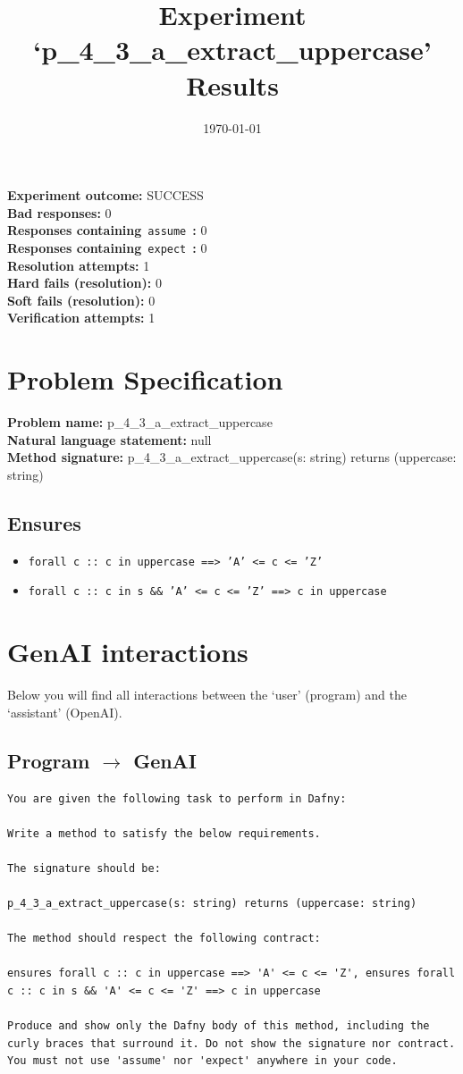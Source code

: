 \documentclass{article}
\begin{document}
\title{Experiment `p\_4\_3\_a\_extract\_uppercase' Results}
\author{\today}
\date{}
\maketitle
\textbf{Experiment outcome: }SUCCESS
\\\textbf{Bad responses: }0
\\\textbf{Responses containing}~\texttt{assume}~\textbf{: }0
\\\textbf{Responses containing}~\texttt{expect}~\textbf{: }0
\\\textbf{Resolution attempts: }1
\\\textbf{Hard fails (resolution): }0
\\\textbf{Soft fails (resolution): }0
\\\textbf{Verification attempts: }1
\section*{Problem Specification}
\textbf{Problem name: }p\_4\_3\_a\_extract\_uppercase
\\\textbf{Natural language statement: }null
\\\textbf{Method signature: }p\_4\_3\_a\_extract\_uppercase(s: string) returns (uppercase: string)
\subsection*{Ensures}
\begin{itemize}
\item \texttt{forall c :: c in uppercase ==> 'A' <= c <= 'Z'}
\item \texttt{forall c :: c in s \&\& 'A' <= c <= 'Z' ==> c in uppercase}
\end{itemize}
\clearpage
\section*{GenAI interactions}
Below you will find all interactions between the `user' (program) and the `assistant' (OpenAI).
\subsection*{Program $\rightarrow$ GenAI}
\begin{lstlisting}
You are given the following task to perform in Dafny:

Write a method to satisfy the below requirements.

The signature should be:

p_4_3_a_extract_uppercase(s: string) returns (uppercase: string)

The method should respect the following contract:

ensures forall c :: c in uppercase ==> 'A' <= c <= 'Z', ensures forall c :: c in s && 'A' <= c <= 'Z' ==> c in uppercase

Produce and show only the Dafny body of this method, including the curly braces that surround it. Do not show the signature nor contract. You must not use 'assume' nor 'expect' anywhere in your code.
\end{lstlisting}
\end{document}
